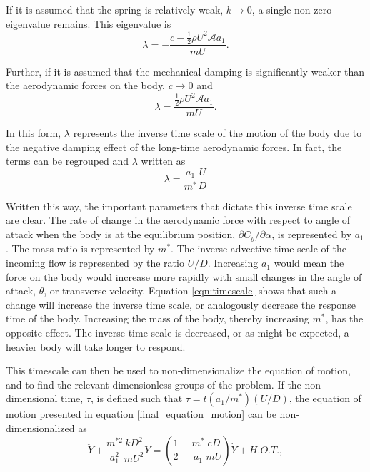 If it is assumed that the spring is relatively weak, $k\rightarrow 0$, a single non-zero eigenvalue remains. This eigenvalue is
\begin{equation}
  \label{eqn:eigs_nospring}
  \lambda=-\frac{c-\frac{1}{2}\rho U^2\mathcal{A}a_1}{mU}.
\end{equation}

Further, if it is assumed that the mechanical damping is significantly weaker than the aerodynamic forces on the body, $c\rightarrow 0$ and
\begin{equation}
  \label{eqn:eigs_nospring_nodamp}
  \lambda=\frac{\frac{1}{2}\rho U^2\mathcal{A}a_1}{mU}.
\end{equation}

In this form, $\lambda$ represents the inverse time scale of the motion of the body due to the negative damping effect of the long-time aerodynamic forces. In fact, the terms can be regrouped and $\lambda$ written as
\begin{equation}
  \label{eqn:timescale}
  \lambda = \frac{a_1}{m^*}\frac{U}{D}
\end{equation}

Written this way, the important parameters that dictate this inverse time scale are clear. The rate of change in the aerodynamic force with respect to angle of attack when the body is at the equilibrium position, $\partial C_y/\partial \alpha$, is represented by $a_1$. The mass ratio is represented by $m^*$. The inverse advective time scale of the incoming flow is represented by the ratio $U/D$. Increasing $a_1$ would mean the force on the body would increase more rapidly with small changes in the angle of attack, $\theta$, or transverse velocity. Equation \ref{eqn:timescale} shows that such a change will increase the inverse time scale, or analogously decrease the response time of the body. Increasing the mass of the body, thereby increasing $m^*$, has the opposite effect. The inverse time scale is decreased, or as might be expected, a heavier body will take longer to respond.

This timescale can then be used to non-dimensionalize the equation of motion, and to find the relevant dimensionless groups of the problem. If the non-dimensional time, $\tau$, is defined such that $\tau=t(a_1/m^*)(U/D)$, the equation of motion presented in equation \ref{final_equation_motion} can be non-dimensionalized as
\begin{equation}
  \label{eqn:eom_nondim}
  \ddot{Y} + \frac{m^{*2}}{a_1^2}\frac{kD^2}{mU^2}Y = \left(\frac{1}{2} - \frac{m^*}{a_1}\frac{cD}{mU}\right)\dot{Y} + H.O.T.,
\end{equation}

